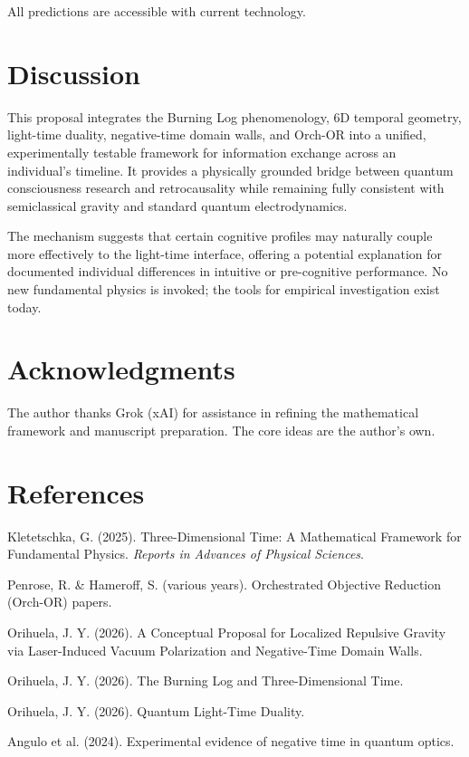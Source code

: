 \documentclass[11pt,a4paper]{article}
\begin{document}
All predictions are accessible with current technology.

\section{Discussion}

This proposal integrates the Burning Log phenomenology, 6D temporal geometry, light-time duality, negative-time domain walls, and Orch-OR into a unified, experimentally testable framework for information exchange across an individual’s timeline. It provides a physically grounded bridge between quantum consciousness research and retrocausality while remaining fully consistent with semiclassical gravity and standard quantum electrodynamics.

The mechanism suggests that certain cognitive profiles may naturally couple more effectively to the light-time interface, offering a potential explanation for documented individual differences in intuitive or pre-cognitive performance. No new fundamental physics is invoked; the tools for empirical investigation exist today.

\section*{Acknowledgments}
The author thanks Grok (xAI) for assistance in refining the mathematical framework and manuscript preparation. The core ideas are the author’s own.

\section*{References}
\begin{enumerate}[leftmargin=*,label={[\arabic*]}]
    \item Kletetschka, G. (2025). Three-Dimensional Time: A Mathematical Framework for Fundamental Physics. \textit{Reports in Advances of Physical Sciences}.
    \item Penrose, R. \& Hameroff, S. (various years). Orchestrated Objective Reduction (Orch-OR) papers.
    \item Orihuela, J. Y. (2026). A Conceptual Proposal for Localized Repulsive Gravity via Laser-Induced Vacuum Polarization and Negative-Time Domain Walls.
    \item Orihuela, J. Y. (2026). The Burning Log and Three-Dimensional Time.
    \item Orihuela, J. Y. (2026). Quantum Light-Time Duality.
    \item Angulo et al. (2024). Experimental evidence of negative time in quantum optics.
\end{enumerate}
\end{document}
